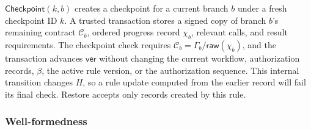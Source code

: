\(\mathsf{Checkpoint}(k,b)\) creates a checkpoint for a current branch \(b\) under a fresh checkpoint ID \(k\).
A trusted transaction stores a signed copy of branch \(b\)'s remaining contract \(\mathcal C_b\), ordered progress record \(\chi_b\), relevant calls, and result requirements.
The checkpoint check requires \(\mathcal C_b=\Gamma_b/\mathsf{raw}(\chi_b)\), and the transaction advances \(\mathsf{ver}\) without changing the current workflow, authorization records, \(\beta\), the active rule version, or the authorization sequence.
This internal transition changes \(H\), so a rule update computed from the earlier record will fail its final check.
Restore accepts only records created by this rule.

\subsubsection{Well-formedness}

